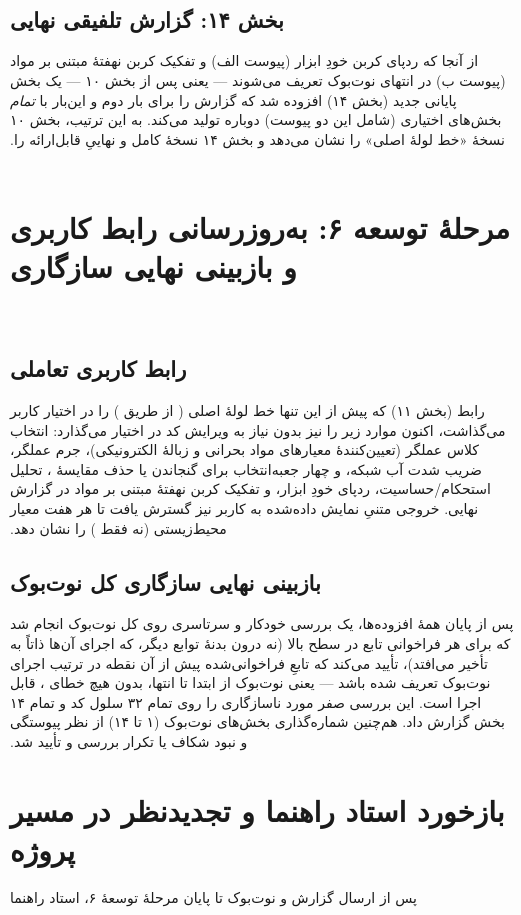 ‫\documentclass[a4paper,12pt]{article}
\begin{document}
‫
‫
‫
‫\subsection{بخش ۱۴: گزارش تلفیقی نهایی}
‫از آنجا که ردپای کربن خودِ ابزار (پیوست الف) و تفکیک کربن نهفتهٔ
‫مبتنی بر مواد (پیوست ب) در انتهای نوت‌بوک تعریف می‌شوند — یعنی پس
‫از بخش ۱۰ — یک بخش پایانی جدید (بخش ۱۴) افزوده شد که گزارش را برای
‫بار دوم و این‌بار با \emph{تمام} بخش‌های اختیاری (شامل این دو پیوست)
‫دوباره تولید می‌کند. به این ترتیب، بخش ۱۰ نسخهٔ «خط لولهٔ اصلی» را
‫نشان می‌دهد و بخش ۱۴ نسخهٔ کامل و نهاییِ قابل‌ارائه را.
‫
‫\section{مرحلهٔ توسعه ۶: به‌روزرسانی رابط کاربری و بازبینی نهایی سازگاری}
‫
‫\subsection{رابط کاربری تعاملی}
‫رابط  (بخش ۱۱) که پیش از این تنها خط لولهٔ اصلی
‫( از طریق ) را در اختیار کاربر می‌گذاشت، اکنون
‫موارد زیر را نیز بدون نیاز به ویرایش کد در اختیار می‌گذارد: انتخاب
‫کلاس عملگر (تعیین‌کنندهٔ معیارهای مواد بحرانی و زبالهٔ الکترونیکی)،
‫جرم عملگر، ضریب شدت آب شبکه، و چهار جعبه‌انتخاب برای گنجاندن یا
‫حذف مقایسهٔ ، تحلیل استحکام/حساسیت، ردپای خودِ ابزار، و
‫تفکیک کربن نهفتهٔ مبتنی بر مواد در گزارش نهایی. خروجی متنیِ نمایش
‫داده‌شده به کاربر نیز گسترش یافت تا هر هفت معیار محیط‌زیستی (نه فقط
‫) را نشان دهد.
‫
‫\subsection{بازبینی نهایی سازگاری کل نوت‌بوک}
‫پس از پایان همهٔ افزوده‌ها، یک بررسی خودکار و سرتاسری روی کل نوت‌بوک
‫انجام شد که برای هر فراخوانی تابع در سطح بالا (نه درون بدنهٔ توابع
‫دیگر، که اجرای آن‌ها ذاتاً به تأخیر می‌افتد)، تأیید می‌کند که تابعِ
‫فراخوانی‌شده پیش از آن نقطه در ترتیب اجرای نوت‌بوک تعریف شده باشد —
‫یعنی نوت‌بوک از ابتدا تا انتها، بدون هیچ خطای ، قابل
‫اجرا است. این بررسی صفر مورد ناسازگاری را روی تمام ۳۲ سلول کد و
‫تمام ۱۴ بخش گزارش داد. هم‌چنین شماره‌گذاری بخش‌های نوت‌بوک (۱ تا
‫۱۴) از نظر پیوستگی و نبود شکاف یا تکرار بررسی و تأیید شد.
‫
‫\section{بازخورد استاد راهنما و تجدیدنظر در مسیر پروژه}
‫پس از ارسال گزارش و نوت‌بوک تا پایان مرحلهٔ توسعهٔ ۶، استاد راهنما
\end{document}
